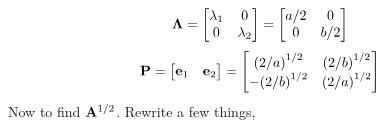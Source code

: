\begin{enumerate}[font=\bfseries]
        \[
            \bold{\Lambda} 
            =
            \begin{bmatrix}
                \lambda_1 & 0 \\
                0 & \lambda_2
            \end{bmatrix}
            =
            \begin{bmatrix}
                a/2 & 0 \\
                0 & b/2
            \end{bmatrix}
        \]
        \[
            \bold{P}
            =
            \begin{bmatrix}
                \bold{e}_1 & \bold{e}_2
            \end{bmatrix}
            =
            \begin{bmatrix}
                {\left(2/a\right)}^{1/2} & {\left(2/b\right)}^{1/2} \\
                -{\left(2/b\right)}^{1/2} & {\left(2/a\right)}^{1/2}
            \end{bmatrix}
        \]
        Now to find $\bold{A}^{1/2}$. Rewrite a few things,
        

\end{enumerate}
